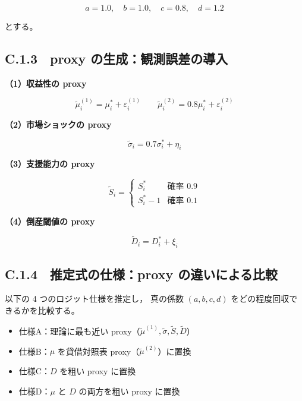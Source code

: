 \[
a = 1.0,\quad b = 1.0,\quad c = 0.8,\quad d = 1.2
\]



とする。

\subsection*{C.1.3　proxy の生成：観測誤差の導入}

\noindent\textbf{（1）収益性の proxy}



\[
\tilde{\mu}^{(1)}_i = \mu^{\ast}_i + \varepsilon^{(1)}_i
\qquad
\tilde{\mu}^{(2)}_i = 0.8 \mu^{\ast}_i + \varepsilon^{(2)}_i
\]



\noindent\textbf{（2）市場ショックの proxy}



\[
\tilde{\sigma}_i = 0.7 \sigma^{\ast}_i + \eta_i
\]



\noindent\textbf{（3）支援能力の proxy}



\[
\tilde{S}_i =
\begin{cases}
S^{\ast}_i & \text{確率 } 0.9 \\
S^{\ast}_i - 1 & \text{確率 } 0.1
\end{cases}
\]



\noindent\textbf{（4）倒産閾値の proxy}



\[
\tilde{D}_i = D^{\ast}_i + \xi_i
\]



\subsection*{C.1.4　推定式の仕様：proxy の違いによる比較}

以下の 4 つのロジット仕様を推定し，
真の係数 $(a,b,c,d)$ をどの程度回収できるかを比較する。

\begin{itemize}
    \item 仕様A：理論に最も近い proxy（$\tilde{\mu}^{(1)}, \tilde{\sigma}, \tilde{S}, \tilde{D}$）
    \item 仕様B：$\mu$ を貸借対照表 proxy（$\tilde{\mu}^{(2)}$）に置換
    \item 仕様C：$D$ を粗い proxy に置換
    \item 仕様D：$\mu$ と $D$ の両方を粗い proxy に置換
\end{itemize}

